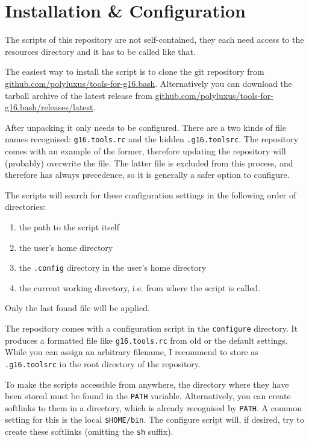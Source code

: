 \documentclass[   %
  final,          %
  a4paper         %
]{article}
\begin{document}
\section{Installation \& Configuration}

The scripts of this repository are not self-contained,
they each need access to the resources directory 
and it has to be called like that.

The easiest way to install the script is to clone the git repository from
\href{https://github.com/polyluxus/tools-for-g16.bash}{github.com/polyluxus/tools-for-g16.bash}.
Alternatively you can download the tarball archive of the latest release from
\href{https://github.com/polyluxus/tools-for-g16.bash/releases/latest}{github.com/polyluxus/tools-for-g16.bash/releases/latest}.

After unpacking it only needs to be configured.
There are a two kinds of file names recognised:
\lstinline`g16.tools.rc` and the hidden \lstinline`.g16.toolsrc`.
The repository comes with an example of the former, 
therefore updating the repository will (probably) overwrite the file.
The latter file is excluded from this process,
and therefore has always precedence, 
so it is generally a safer option to configure.

The scripts will search for these configuration settings in the following order of directories:
\begin{enumerate}
  \item the path to the script itself 
  \item the user's home directory
  \item the \texttt{.config} directory in the user's home directory
  \item the current working directory, i.e. from where the script is called.
\end{enumerate}
Only the last found file will be applied.

The repository comes with a configuration script in the \texttt{configure} directory.
It produces a formatted file like \lstinline`g16.tools.rc` from old or the default settings.
While you can assign an arbitrary filename, 
I recommend to store as \lstinline`.g16.toolsrc` in the root directory of the repository.

To make the scripts accessible from anywhere, the directory where they have been stored
must be found in the \texttt{PATH} variable.
Alternatively, you can create softlinks to them in a directory, 
which is already recognised by \texttt{PATH}.
A common setting for this is the local \texttt{\$HOME/bin}.
The configure script will, if desired, try to create these softlinks (omitting the \texttt{sh} suffix).
\end{document}
